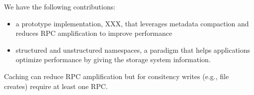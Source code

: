 We have the following contributions:

\begin{itemize}

  \item a prototype implementation, XXX, that leverages metadata
  compaction and reduces RPC amplification to improve performance

  \item structured and unstructured namespaces, a paradigm that helps
  applications optimize performance by giving the storage system information.

\end{itemize}


Caching can reduce RPC amplification but for
consitency writes (e.g., file creates) require at least one RPC. 

